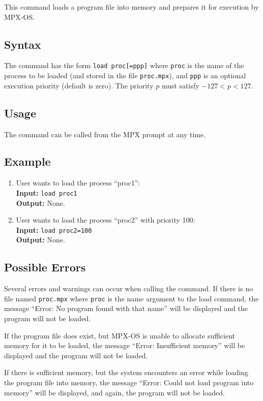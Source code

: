 This command loads a program file into memory and prepares it for execution by MPX-OS.

\subsection{Syntax}

The command has the form {\tt load proc[=ppp]} where {\tt proc} is the name of the process
to be loaded (and stored in the file {\tt proc.mpx}), and {\tt ppp} is an optional
execution priority (default is zero). The priority $p$ must satisfy $-127 < p < 127$.

\subsection{Usage}

The command can be called from the MPX prompt at any time.

\subsection{Example}
\begin{enumerate}
    \item User wants to load the process ``proc1'': \\
        {\bf Input:} {\tt load proc1} \\
        {\bf Output:} None.
    \item User wants to load the process ``proc2'' with priority 100: \\
        {\bf Input:} {\tt load proc2=100} \\
        {\bf Output:} None.
\end{enumerate}
\subsection{Possible Errors}

Several errors and warnings can occur when calling the command. If there is no file named
{\tt proc.mpx} where {\tt proc} is the name argument to the load command, the message 
``Error: No program found with that name'' will be displayed and the program will not be 
loaded.

If the program file does exist, but MPX-OS is unable to allocate sufficient memory for it
to be loaded, the message ``Error: Insufficient memory'' will be displayed and the program
will not be loaded.

If there is sufficient memory, but the system encounters an error while loading the
program file into memory, the message ``Error: Could not load program into memory'' will 
be displayed, and again, the program will not be loaded.

